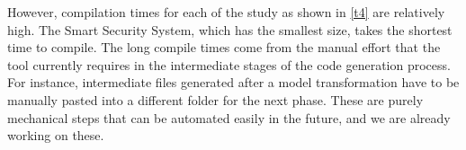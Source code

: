 However, compilation times for each of the study as shown in \ref{t4} are relatively high. The Smart Security System, which has the smallest size, takes the shortest time to compile. The long compile times come from the manual effort that the tool currently requires in the intermediate stages of the code generation process. For instance, intermediate files generated after a model transformation have to be manually pasted into a different folder for the next phase. These are purely mechanical steps that can be automated easily in the future, and we are already working on these. 





